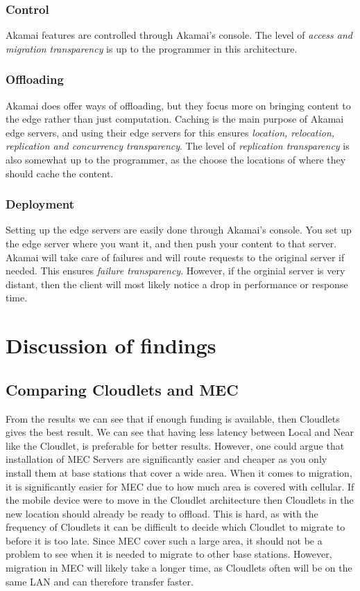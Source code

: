 \subsubsection{Control}
Akamai features are controlled through Akamai's console. The level of \textit{access and migration transparency} is up to the programmer in this architecture.

\subsubsection{Offloading}
Akamai does offer ways of offloading, but they focus more on bringing content to the edge rather than just computation. Caching is the main purpose of Akamai edge servers, and using their edge servers for this ensures \textit{location, relocation, replication and concurrency transparency}. The level of \textit{replication transparency} is also somewhat up to the programmer, as the choose the locations of where they should cache the content.

\subsubsection{Deployment}
Setting up the edge servers are easily done through Akamai's console. You set up the edge server where you want it, and then push your content to that server. Akamai will take care of failures and will route requests to the original server if needed. This ensures \textit{failure transparency}. However, if the orginial server is very distant, then the client will most likely notice a drop in performance or response time.






\section{Discussion of findings}

\subsection{Comparing Cloudlets and MEC}
From the results we can see that if enough funding is available, then Cloudlets gives the best result. We can see that having less latency between Local and Near like the Cloudlet, is preferable for better results. However, one could argue that installation of MEC Servers are significantly easier and cheaper as you only install them at base stations that cover a wide area. When it comes to migration, it is significantly easier for MEC due to how much area is covered with cellular. If the mobile device were to move in the Cloudlet architecture then Cloudlets in the new location should already be ready to offload. This is hard, as with the frequency of Cloudlets it can be difficult to decide which Cloudlet to migrate to before it is too late. Since MEC cover such a large area, it should not be a problem to see when it is needed to migrate to other base stations. However, migration in MEC will likely take a longer time, as Cloudlets often will be on the same LAN and can therefore transfer faster.

